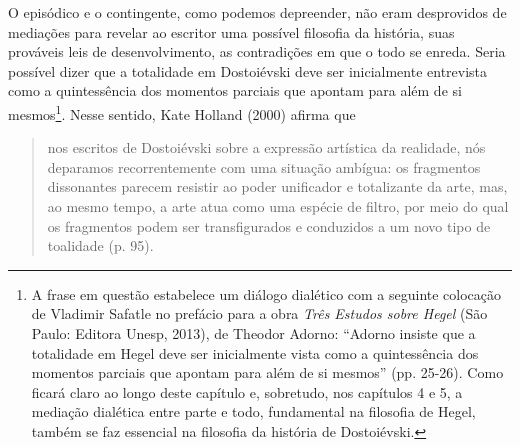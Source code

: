O episódico e o contingente, como podemos depreender, não eram
desprovidos de mediações para revelar ao escritor uma possível filosofia
da história, suas prováveis leis de desenvolvimento, as contradições em
que o todo se enreda. Seria possível dizer que a totalidade em
Dostoiévski deve ser inicialmente entrevista como a quintessência dos
momentos parciais que apontam para além de si mesmos\footnote{A frase em
  questão estabelece um diálogo dialético com a seguinte colocação de
  Vladimir Safatle no prefácio para a obra \emph{Três Estudos sobre
  Hegel} (São Paulo: Editora Unesp, 2013), de Theodor Adorno: ``Adorno
  insiste que a totalidade em Hegel deve ser inicialmente vista como a
  quintessência dos momentos parciais que apontam para além de si
  mesmos'' (pp. 25-26). Como ficará claro ao longo deste capítulo e,
  sobretudo, nos capítulos 4 e 5, a mediação dialética entre parte e
  todo, fundamental na filosofia de Hegel, também se faz essencial na
  filosofia da história de Dostoiévski.}. Nesse sentido, Kate Holland
(2000) afirma que

\begin{quote}
nos escritos de Dostoiévski sobre a expressão artística da realidade,
nós deparamos recorrentemente com uma situação ambígua: os fragmentos
dissonantes parecem resistir ao poder unificador e totalizante da arte,
mas, ao mesmo tempo, a arte atua como uma espécie de filtro, por meio do
qual os fragmentos podem ser transfigurados e conduzidos a um novo tipo
de toalidade (p. 95).
\end{quote}

